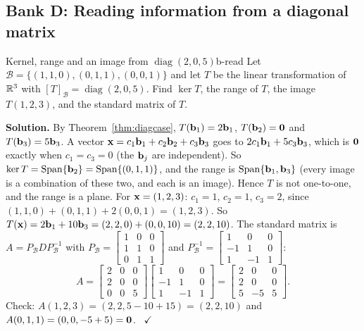 \documentclass[11pt]{article}
\begin{document}
\subsection*{Bank D: Reading information from a diagonal matrix}
\begin{exmp}{Kernel, range and an image from $\operatorname{diag}(2,0,5)$}{b-read}
Let $\mathcal{B}=\{(1,1,0),(0,1,1),(0,0,1)\}$ and let $T$ be the linear transformation of $\mathbb{R}^3$ with $[T]_{\mathcal{B}}=\operatorname{diag}(2,0,5)$. Find $\ker T$, the range of $T$, the image $T(1,2,3)$, and the standard matrix of $T$.

\textbf{Solution.} By Theorem~\ref{thm:diagcase}, $T(\mathbf{b}_1)=2\mathbf{b}_1$, $T(\mathbf{b}_2)=\mathbf{0}$ and $T(\mathbf{b}_3)=5\mathbf{b}_3$. A vector $\mathbf{x}=c_1\mathbf{b}_1+c_2\mathbf{b}_2+c_3\mathbf{b}_3$ goes to $2c_1\mathbf{b}_1+5c_3\mathbf{b}_3$, which is $\mathbf{0}$ exactly when $c_1=c_3=0$ (the $\mathbf{b}_j$ are independent). So $\ker T=\operatorname{Span}\{\mathbf{b}_2\}=\operatorname{Span}\{(0,1,1)\}$, and the range is $\operatorname{Span}\{\mathbf{b}_1,\mathbf{b}_3\}$ (every image is a combination of these two, and each is an image). Hence $T$ is not one-to-one, and the range is a plane. For $\mathbf{x}=(1,2,3)$: $c_1=1$, $c_2=1$, $c_3=2$, since $(1,1,0)+(0,1,1)+2(0,0,1)=(1,2,3)$. So $T(\mathbf{x})=2\mathbf{b}_1+10\mathbf{b}_3=(2,2,0)+(0,0,10)=(2,2,10)$. The standard matrix is $A=P_{\mathcal{B}}DP_{\mathcal{B}}^{-1}$ with $P_{\mathcal{B}}=\begin{bmatrix}1&0&0\\1&1&0\\0&1&1\end{bmatrix}$ and $P_{\mathcal{B}}^{-1}=\begin{bmatrix}1&0&0\\-1&1&0\\1&-1&1\end{bmatrix}$:
\[
A=\begin{bmatrix}2&0&0\\2&0&0\\0&0&5\end{bmatrix}\begin{bmatrix}1&0&0\\-1&1&0\\1&-1&1\end{bmatrix}=\begin{bmatrix}2&0&0\\2&0&0\\5&-5&5\end{bmatrix}.
\]
Check: $A(1,2,3)=(2,2,5-10+15)=(2,2,10)$ and $A(0,1,1)=(0,0,-5+5)=\mathbf{0}$. \ $\checkmark$
\end{exmp}
\end{document}
